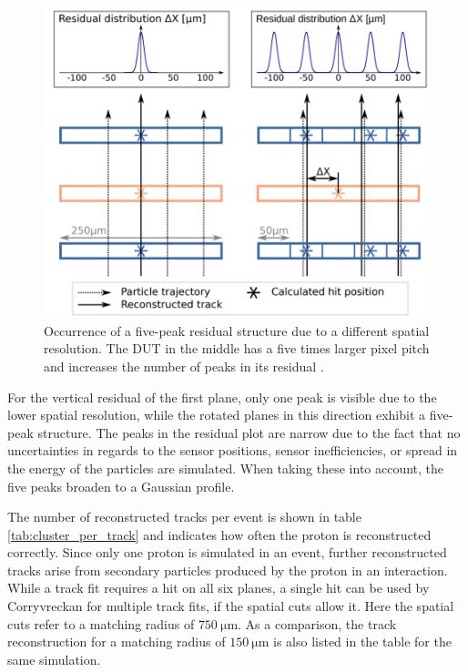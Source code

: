 \begin{figure}
  \centering
  \includegraphics[height=0.6\textwidth]{images/peaks.png}
  \caption{Occurrence of a five-peak residual structure due to a different spatial resolution. The DUT in the middle
  has a five times larger pixel pitch and increases the number of peaks in its residual \cite{peaks}.}
  \label{fig:peaks}
\end{figure}

For the vertical residual of the first plane, only one peak is visible due to the lower spatial resolution, while the rotated planes
in this direction exhibit a five-peak structure. The peaks in the residual plot are narrow due to the fact that no uncertainties in regards
to the sensor positions, sensor inefficiencies, or spread in the energy of the particles are simulated. When taking these into account, the
five peaks broaden to a Gaussian profile.

The number of reconstructed tracks per event is shown in table \ref{tab:cluster_per_track} and indicates how often the proton is
reconstructed correctly. Since only one proton is simulated in an event, further reconstructed tracks arise from secondary
particles produced by the proton in an interaction. While a track fit requires a hit on all six planes, a single hit can be used by
Corryvreckan for multiple track fits, if the spatial cuts allow it. Here the spatial cuts refer to a matching radius of $\SI{750}{\micro\meter}$.
As a comparison, the track reconstruction for a matching radius of $\SI{150}{\micro\meter}$ is also listed in the table for the same
simulation.

